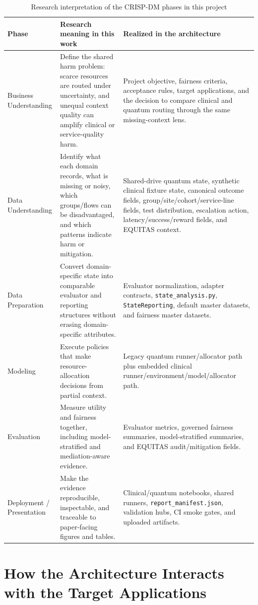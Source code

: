 \documentclass{IEEEtran}
\begin{document}
\begin{table}[ht!]
\centering
\caption{Research interpretation of the CRISP-DM phases in this project}
\label{tab:crisp_alignment}
\small
\begin{tabularx}{\textwidth}{p{2.7cm}p{6.2cm}p{7.0cm}}
\toprule
\textbf{Phase} & \textbf{Research meaning in this work} & \textbf{Realized in the architecture} \\
\midrule
Business Understanding & Define the shared harm problem: scarce resources are routed under uncertainty, and unequal context quality can amplify clinical or service-quality harm. & Project objective, fairness criteria, acceptance rules, target applications, and the decision to compare clinical and quantum routing through the same missing-context lens. \\
Data Understanding & Identify what each domain records, what is missing or noisy, which groups/flows can be disadvantaged, and which patterns indicate harm or mitigation. & Shared-drive quantum state, synthetic clinical fixture state, canonical outcome fields, group/site/cohort/service-line fields, test distribution, escalation action, latency/success/reward fields, and EQUITAS context. \\
Data Preparation & Convert domain-specific state into comparable evaluator and reporting structures without erasing domain-specific attributes. & Evaluator normalization, adapter contracts, \texttt{state\_analysis.py}, \texttt{StateReporting}, default master datasets, and fairness master datasets. \\
Modeling & Execute policies that make resource-allocation decisions from partial context. & Legacy quantum runner/allocator path plus embedded clinical runner/environment/model/allocator path. \\
Evaluation & Measure utility and fairness together, including model-stratified and mediation-aware evidence. & Evaluator metrics, governed fairness summaries, model-stratified summaries, and EQUITAS audit/mitigation fields. \\
Deployment / Presentation & Make the evidence reproducible, inspectable, and traceable to paper-facing figures and tables. & Clinical/quantum notebooks, shared runners, \texttt{report\_manifest.json}, validation hubs, CI smoke gates, and uploaded artifacts. \\
\bottomrule
\end{tabularx}
\end{table}

\section{How the Architecture Interacts with the Target Applications}
\end{document}
